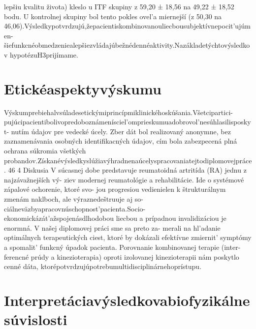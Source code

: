 lepšiu kvalitu života) kleslo u ITF skupiny z 59,20 ± 18,56 na 49,22 ± 18,52 bodu. U kontrolnej skupiny bol tento pokles ovel’a miernejší (z 50,30 na 46,06).Výsledkypotvrdzujú,žepacientiskombinovanouliecbousubjektívnepocit’ujúmen- šiefunkcnéobmedzeniealepšiezvládajúbežnédennéaktivity.Nazákladetýchtovýsledkov hypotézuH3prijímame.


\section{Etickéaspektyvýskumu}

Výskumprebiehalvsúladesetickýmiprincípmiklinickéhoskúšania.Všetcipartici- pujúcipacientibolivopredoboznámenísciel’omprieskumuadobrovol’nesúhlasilisposkyt- nutím údajov pre vedecké úcely. Zber dát bol realizovaný anonymne, bez zaznamenávania osobných identifikacných údajov, cím bola zabezpecená plná ochrana súkromia všetkých probandov.Získanévýsledkyslúžiavýhradnenaúcelyspracovaniatejtodiplomovejpráce. 46 4 Diskusia V súcasnej dobe predstavuje reumatoidná artritída (RA) jednu z najzávažnejších vý- ziev modernej reumatológie a rehabilitácie. Ide o systémové zápalové ochorenie, ktoré svo- jou progresiou vedienielen k štrukturálnym zmenám naklboch, ale výraznedeštruuje aj so- ciálneväzbyapracovnúschopnost’pacienta.Socio-ekonomickázát’ažspojenásdlhodobou liecbou a prípadnou invalidizáciou je enormná. V našej diplomovej práci sme sa preto za- merali na hl’adanie optimálnych terapeutických ciest, ktoré by dokázali efektívne zmiernit’ symptómy a spomalit’ funkcný úpadok pacienta. Porovnanie kombinovanej terapie (inter- ferencné prúdy a kinezioterapia) oproti izolovanej kinezioterapii nám poskytlo cenné dáta, ktorépotvrdzujúpotrebumultidisciplinárnehoprístupu.


\section{Interpretáciavýsledkovabiofyzikálnesúvislosti}

